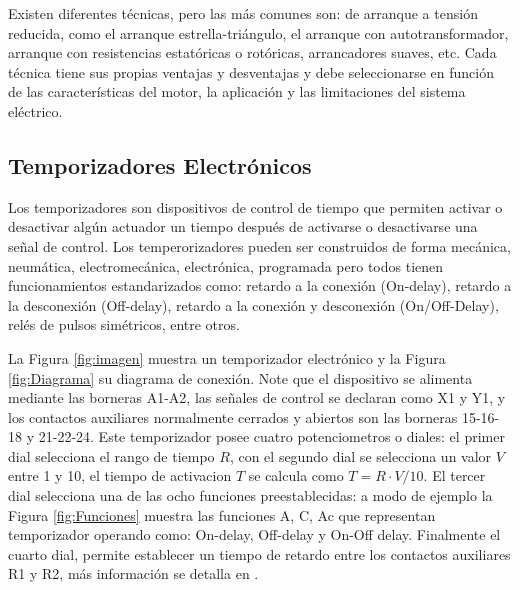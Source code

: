 Existen diferentes técnicas, pero las más comunes son: de arranque a tensión reducida, como el arranque estrella-triángulo, el arranque con autotransformador, arranque con resistencias estatóricas o rotóricas, arrancadores suaves, etc. Cada técnica tiene sus propias ventajas y desventajas y debe seleccionarse en función de las características del motor, la aplicación y las limitaciones del sistema eléctrico.

\subsection{Temporizadores Electrónicos}

Los temporizadores son dispositivos de control de tiempo que permiten activar o desactivar algún actuador un tiempo después de activarse o desactivarse una señal de control. Los temperorizadores pueden ser  construidos de forma mecánica, neumática, electromecánica, electrónica, programada pero todos tienen funcionamientos estandarizados como: retardo a la conexión (On-delay), retardo a la desconexión (Off-delay), retardo a la conexión y desconexión (On/Off-Delay), relés de pulsos simétricos, entre otros. 

La Figura \ref{fig:imagen} muestra un temporizador electrónico y la Figura \ref{fig:Diagrama} su diagrama de conexión. Note que el dispositivo se alimenta mediante las borneras A1-A2,  las señales de control se declaran como X1 y Y1, y los contactos auxiliares normalmente cerrados y abiertos son las borneras 15-16-18 y 21-22-24. Este temporizador posee cuatro potenciometros o diales: el  primer dial selecciona el rango de tiempo $R$, con el segundo dial se selecciona un valor $V$ entre 1 y 10, el tiempo de activacion  $T$ se calcula como  $T=R\cdot V/10$. El tercer dial selecciona una de las ocho funciones preestablecidas: a modo de ejemplo la Figura \ref{fig:Funciones} muestra las funciones A, C, Ac que representan temporizador operando como: On-delay, Off-delay y On-Off delay. Finalmente el cuarto dial, permite establecer un tiempo de retardo entre los contactos auxiliares R1 y R2, más información se detalla en \cite{Scheneider4}.


